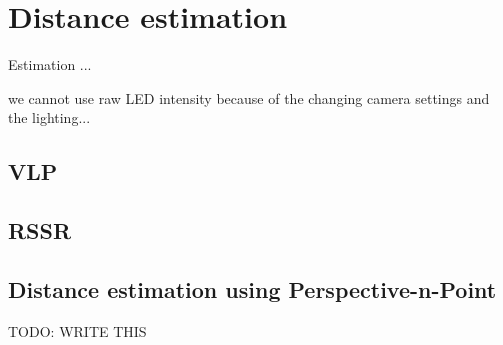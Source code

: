 
\chapter{Distance estimation\label{chap:p3p}}

Estimation ...

we cannot use raw LED intensity because of the changing camera settings and the lighting...

\section{VLP}

\section{RSSR}

\section{Distance estimation using Perspective-n-Point}

TODO: WRITE THIS
